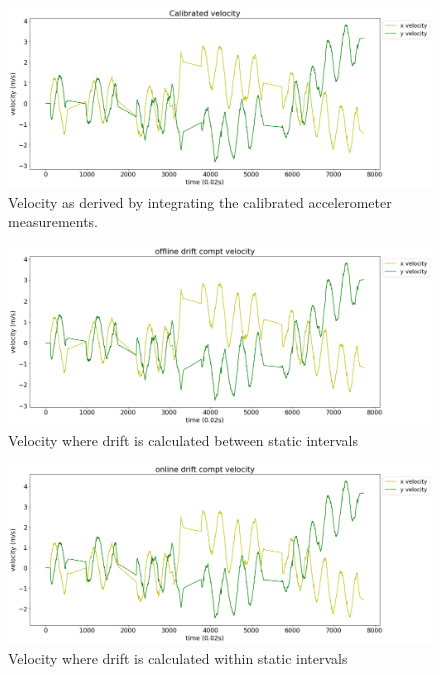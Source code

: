 \documentclass{article}
\begin{document}
      \begin{figure}[H]
        \centering
        \includegraphics[width=0.85\linewidth]{./images/calibrated_velocity.png}
        \caption{Velocity as derived by integrating the calibrated accelerometer measurements.}
        \label{fig:calibrated_velocity_ref}
      \end{figure}

      \begin{figure}[H]
        \centering
        \includegraphics[width=0.85\linewidth]{./images/offline_drift_compensation.png}
        \caption{Velocity where drift is calculated between static intervals}
        \label{fig:offline_drift_compensation}
      \end{figure}

      \begin{figure}[H]
        \centering
        \includegraphics[width=0.85\linewidth]{./images/online_drift_compensation.png}
        \caption{Velocity where drift is calculated within static intervals}
        \label{fig:online_drift_compensation}
      \end{figure}
\end{document}
